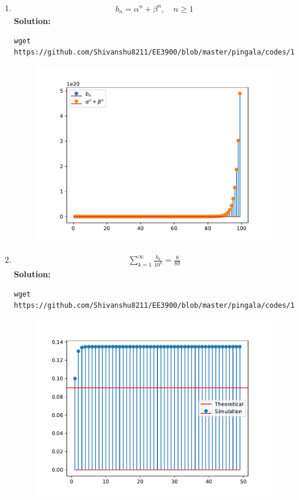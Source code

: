 \documentclass[journal,12pt,twocolumn]{IEEEtran}
\newcommand{\solution}{\noindent \textbf{Solution: }}
\numberwithin{equation}{section}
\renewcommand\thesection{\arabic{section}}
\begin{document}
\begin{enumerate}[label=\thesection.\arabic*
,ref=\thesection.\theenumi]
\begin{figure}[!ht]
    \caption{}
\end{figure}
 \item 
\begin{align}
	b_n =\alpha^n + \beta^n, \quad n \ge 1
\end{align}
\solution
\begin{lstlisting}
wget https://github.com/Shivanshu8211/EE3900/blob/master/pingala/codes/1.3.py
\end{lstlisting}
\begin{figure}[!ht]
    \includegraphics[width=\columnwidth]{figs/1.3}
    \caption{}
\end{figure}
 \item 
\begin{align}
	\sum_{k=1}^{\infty}\frac{b_k}{10^k} =\frac{8}{89}
\end{align}
\solution
\begin{lstlisting}
wget https://github.com/Shivanshu8211/EE3900/blob/master/pingala/codes/1.4.py
\end{lstlisting}
\begin{figure}[!ht]
    \includegraphics[width=\columnwidth]{figs/1.4}
    \caption{}
\end{figure}
\end{enumerate}
\end{document}
